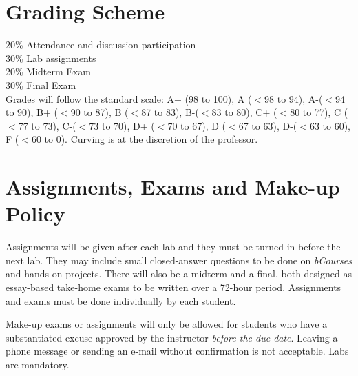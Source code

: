 \documentclass[letterpaper]{inzane_syllabus} %
\begin{document}
\vspace{0.5cm}
\section{Grading Scheme}

20\% Attendance and discussion participation \\
30\% Lab assignments \\
20\% Midterm Exam \\
30\% Final Exam \\

Grades will follow the standard scale: A+ (98 to 100), A ($<$98 to 94), A-($<$94 to 90), B+ ($<$90 to 87), B ($<$87 to 83), B-($<$83 to 80), C+ ($<$80 to 77), C ($<$77 to 73), C-($<$73 to 70), D+ ($<$70 to 67), D ($<$67 to 63), D-($<$63 to 60), F ($<$60 to 0). Curving is at the discretion of the professor. 


\newpage %

\makeSide %



\vspace{0.5cm}
\section{Assignments, Exams and Make-up Policy}

Assignments will be given after each lab and they must be turned in before the next lab. They may include small closed-answer questions to be done on \emph{bCourses} and hands-on projects. There will also be a midterm  and a final, both designed as essay-based take-home exams to be written over a 72-hour period. Assignments and exams must be done individually by each student.

Make-up exams or assignments will only be allowed for students who have a substantiated excuse approved by the instructor \emph{before the due date}. Leaving a phone message or sending an e-mail without confirmation is not acceptable. Labs are mandatory.
\end{document}
